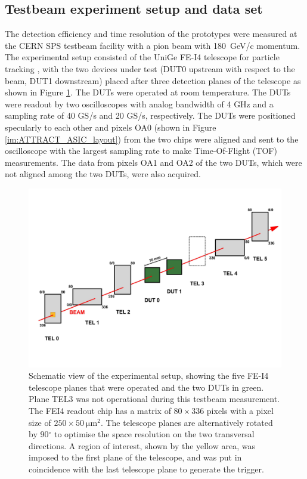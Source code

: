		
		
		\subsection{Testbeam experiment setup and data set}

		The detection efficiency and time resolution of the prototypes were measured at the CERN SPS testbeam facility with a pion beam with \SI{180}{\giga\electronvolt}/c momentum. The experimental setup consisted of the UniGe FE-I4 telescope for particle tracking \cite{telescope}, with the two devices under test (DUT0 upstream with respect to the beam, DUT1 downstream) placed after three detection planes of the telescope as shown in Figure \ref{im:ATTRACT_Setup}. The DUTs were operated at room temperature. The DUTs were readout by two oscilloscopes with analog bandwidth of 4 GHz and a sampling rate of 40 GS/s and 20 GS/s, respectively. The DUTs were positioned specularly to each other and pixels OA0 (shown in Figure \ref{im:ATTRACT_ASIC_layout}) from the two chips were aligned and sent to the oscilloscope with the largest sampling rate to make Time-Of-Flight (TOF) measurements. The data from pixels OA1 and OA2 of the two DUTs, which were not aligned among the two DUTs, were also acquired.

		\begin{figure}[h]
			\centering
			\includegraphics[width=0.75\linewidth]{files/ATTRACT_paper/Setup_reprint.pdf}
			\caption{Schematic view of the experimental setup, showing the five FE-I4 telescope \cite{telescope} planes that were operated and the two DUTs in green. Plane TEL3 was not operational during this testbeam measurement. The FEI4 readout chip has a matrix of $ 80 \times 336 $ pixels with a pixel size of $ 250 \times 50 ~\si{\micro\meter\squared} $. The telescope planes are alternatively rotated by 90$^\circ$ to optimise the space resolution on the two transversal directions. A region of interest, shown by the yellow area, was imposed to the first plane of the telescope, and was put in coincidence with the last telescope plane to generate the trigger.}
			\label{im:ATTRACT_Setup} 
		\end{figure}

